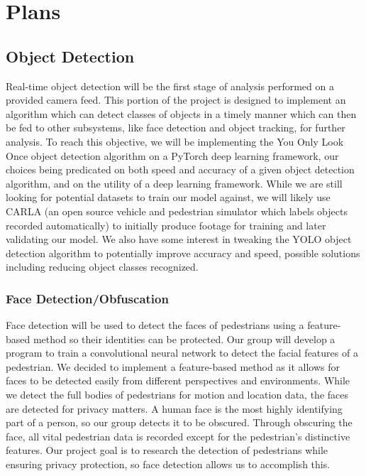 \section{Plans}
\subsection{Object Detection}
Real-time object detection will be the first stage of analysis performed on a provided camera feed. This portion of the project is designed to implement an algorithm which can detect classes of objects in a timely manner which can then be fed to other subsystems, like face detection and object tracking, for further analysis. To reach this objective, we will be implementing the You Only Look Once object detection algorithm on a PyTorch deep learning framework, our choices being predicated on both speed and accuracy of a given object detection algorithm, and on the utility of a deep learning framework. While we are still looking for potential datasets to train our model against, we will likely use CARLA (an open source vehicle and pedestrian simulator which labels objects recorded automatically) to initially produce footage for training and later validating our model. We also have some interest in tweaking the YOLO object detection algorithm to potentially improve accuracy and speed, possible solutions including reducing object classes recognized.

\subsubsection{Face Detection/Obfuscation}
Face detection will be used to detect the faces of pedestrians using a feature-based method so their identities can be protected. Our group will develop a program to train a convolutional neural network to detect the facial features of a pedestrian. We decided to implement a feature-based method as it allows for faces to be detected easily from different perspectives and environments. While we detect the full bodies of pedestrians for motion and location data, the faces are detected for privacy matters. A human face is the most highly identifying part of a person, so our group detects it to be obscured. Through obscuring the face, all vital pedestrian data is recorded except for the pedestrian’s distinctive features. Our project goal is to research the detection of pedestrians while ensuring privacy protection, so face detection allows us to accomplish this.

